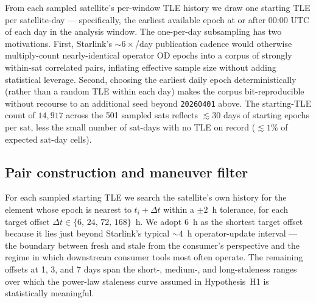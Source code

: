 \documentclass[10pt, letterpaper]{article}
\begin{document}
From each sampled satellite's per-window TLE history we draw one
starting TLE per satellite-day --- specifically, the earliest
available epoch at or after 00{:}00 UTC of each day in the
analysis window. The one-per-day subsampling has two motivations.
First, Starlink's $\sim 6\times$/day publication cadence would
otherwise multiply-count nearly-identical operator OD epochs into
a corpus of strongly within-sat correlated pairs, inflating
effective sample size without adding statistical leverage.
Second, choosing the earliest daily epoch deterministically (rather
than a random TLE within each day) makes the corpus bit-reproducible
without recourse to an additional seed beyond
\texttt{20260401} above. The starting-TLE count of $14{,}917$ across
the 501 sampled sats reflects $\lesssim 30$ days of starting epochs
per sat, less the small number of sat-days with no TLE on record
($\lesssim 1\%$ of expected sat-day cells).

\subsection{Pair construction and maneuver filter}
\label{sec:methods-pairs}

For each sampled starting TLE we search the satellite's own history
for the element whose epoch is nearest to $t_{i} + \Delta t$ within a
$\pm 2$~h tolerance, for each target offset
$\Delta t \in \{6,\,24,\,72,\,168\}$~h. We adopt 6~h as the shortest
target offset because it lies just beyond Starlink's typical
$\sim 4$~h operator-update interval --- the boundary between fresh
and stale from the consumer's perspective and the regime in which
downstream consumer tools most often operate. The remaining offsets
at 1, 3, and 7 days span the short-, medium-, and long-staleness
ranges over which the power-law staleness curve assumed in
Hypothesis~H1 is statistically meaningful.
\end{document}
